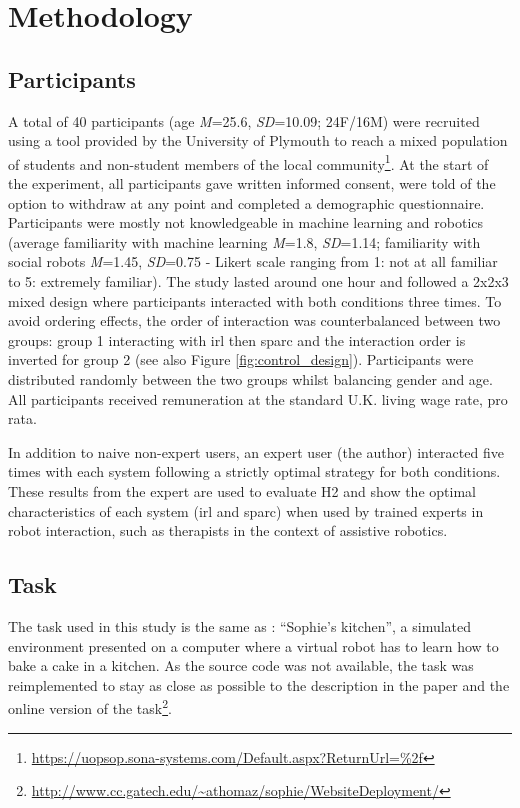\section{Methodology}
\subsection{Participants}

A total of 40 participants (age \textit{M}=25.6, \textit{SD}=10.09; 24F/16M) were recruited using a tool provided by the University of Plymouth to reach a mixed population of students and non-student members of the local community\footnote{\url{https://uopsop.sona-systems.com/Default.aspx?ReturnUrl=\%2f}}. At the start of the experiment, all participants gave written informed consent, were told of the option to withdraw at any point and completed a demographic questionnaire. Participants were mostly not knowledgeable in machine learning and robotics (average familiarity with machine learning \textit{M}=1.8, \textit{SD}=1.14; familiarity with social robots \textit{M}=1.45, \textit{SD}=0.75 - Likert scale ranging from 1: not at all familiar to 5: extremely familiar). The study lasted around one hour and followed a 2x2x3 mixed design where participants interacted with both conditions three times. To avoid ordering effects, the order of interaction was counterbalanced between two groups: group 1 interacting with \gls{irl} then \gls{sparc} and the interaction order is inverted for group 2 (see also Figure \ref{fig:control_design}). Participants were distributed randomly between the two groups whilst balancing gender and age. All participants received remuneration at the standard U.K. living wage rate, pro rata. 

In addition to naive non-expert users, an expert user (the author) interacted five times with each system following a strictly optimal strategy for both conditions. These results from the expert are used to evaluate H2 and show the optimal characteristics of each system (\gls{irl} and \gls{sparc}) when used by trained experts in robot interaction, such as therapists in the context of assistive robotics.


\subsection{Task} \label{ssec:control_task}

The task used in this study is the same as \cite{thomaz2008teachable}: ``Sophie's kitchen'', a simulated environment presented on a computer where a virtual robot has to learn how to bake a cake in a kitchen. As the source code was not available, the task was reimplemented to stay as close as possible to the description in the paper and the online version of the task\footnote{\url{http://www.cc.gatech.edu/~athomaz/sophie/WebsiteDeployment/}}.


